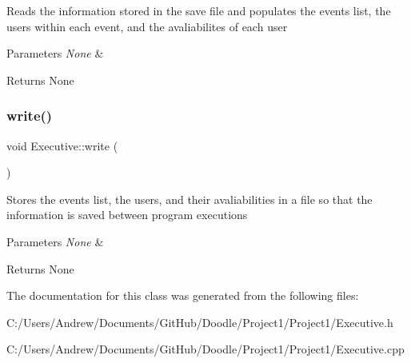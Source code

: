 Reads the information stored in the save file and populates the events list, the users within each event, and the avaliabilites of each user 
\begin{DoxyParams}{Parameters}
{\em None} & \\
\hline
\end{DoxyParams}
\begin{DoxyReturn}{Returns}
None 
\end{DoxyReturn}
\mbox{\label{class_executive_a49841644378cd9bb4b8c1cc2eee04003}} 
\subsubsection{\texorpdfstring{write()}{write()}}
{\footnotesize\ttfamily void Executive\+::write (\begin{DoxyParamCaption}{ }\end{DoxyParamCaption})}

Stores the events list, the users, and their avaliabilities in a file so that the information is saved between program executions 
\begin{DoxyParams}{Parameters}
{\em None} & \\
\hline
\end{DoxyParams}
\begin{DoxyReturn}{Returns}
None 
\end{DoxyReturn}


The documentation for this class was generated from the following files\+:\begin{DoxyCompactItemize}
\item 
C\+:/\+Users/\+Andrew/\+Documents/\+Git\+Hub/\+Doodle/\+Project1/\+Project1/Executive.\+h\item 
C\+:/\+Users/\+Andrew/\+Documents/\+Git\+Hub/\+Doodle/\+Project1/\+Project1/Executive.\+cpp\end{DoxyCompactItemize}
